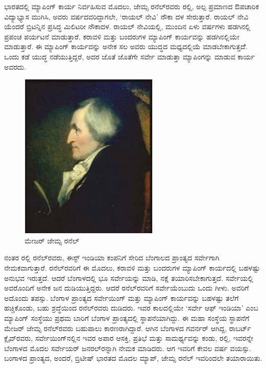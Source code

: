 ಭಾರತದಲ್ಲಿ ಮ್ಯಾಪಿಂಗ್​ ಕಾರ್ಯ ನಿರ್ವಹಿಸುವ ಮೊದಲು, ಜೇಮ್ಸ ರನೆಲ್​ರವರು  ರಲ್ಲಿ, ಅಲ್ಪ ಪ್ರಮಾಣದ ಔಪಚಾರಿಕ ವಿದ್ಯಾಭ್ಯಾಸ ಮುಗಿಸಿ, ಅವರು  ವರ್ಷದವರಿದ್ದಾಗಲೇ, ‘ರಾಯಲ್​ ನೇವಿ’ ನೌಕಾ ದಳ ಸೇರುತ್ತಾರೆ. ರಾಯಲ್​ ನೇವಿ ಯೆಂದರೆ ಬ್ರಿಟನ್ನಿನ ಪ್ರಸಿದ್ಧ ಮಿಲಿಟರೀ ನೌಕಾದಳ. ರಾಯಲ್​ ನೇವಿಯಲ್ಲಿ, ಮುಂದಿನ ಏಳು ವರ್ಷಗಳು ಹಡಗಿನಲ್ಲಿ ಪ್ರಪಂಚ ಪರ್ಯಟನೆ ಮಾಡುತ್ತಾರೆ. ಕರಾವಳಿ ಮತ್ತು ಬಂದರುಗಳ ಮ್ಯಾಪಿಂಗ್​ ಕಾರ್ಯವನ್ನು ಹಡಗಿನಲ್ಲಿಯೇ ಮಾಡುತ್ತಾರೆ. ಈ ಮ್ಯಾಪಿಂಗ್​ ಕಾರ್ಯವನ್ನು ಅನೇಕ ಸಲ ಅವರು ಯುದ್ಧದ ಮಧ್ಯದಲ್ಲಿಯೆ ಮಾಡಬೇಕಾಗುತ್ತದೆೆ. ಒಂದು ಕಡೆ ಯುದ್ಧ ನಡೆಯುತ್ತಿದ್ದರೆ, ಅದರ ಜೊತೆ ಜೊತೆಗೇ ಸರ್ವೇ ಮಾಡುತ್ತಾ ಮ್ಯಾಪಿಂಗನ್ನು ಮಾಡುವ ಕಾರ್ಯ ಅವರದು.

\begin{figure}
\includegraphics[scale=0.6]{"images/image017.jpg"}
\caption{ಮೇಜರ್​ ಜೇಮ್ಸ ರನೆಲ್​}\label{chap13-fig1}
\end{figure}

ನಂತರ  ರಲ್ಲಿ ರನೆಲ್​ರವರು, ಈಸ್ಟ್​ ಇಂಡಿಯಾ ಕಂಪನಿಗೆ ಸೇರಿದ ಬೆಂಗಾಲದ ಪ್ರಾಂತ್ಯದ ಸರ್ವೇಗಾಗಿ ನೇಮಕವಾಗುತ್ತಾರೆ. ರನೆಲ್​ರವರಿಗೆ ಈ ಮೊದಲು, ಕರಾವಳಿ ಮತ್ತು ಬಂದರುಗಳ ಮ್ಯಾಪಿಂಗ್​ ಕಾರ್ಯದಲ್ಲಿ ಬಹಳಷ್ಟು ಅನುಭವ ಇರುತ್ತದೆ. ಆದರೆ ಬೆಂಗಾಳದಲ್ಲಿ ಭೂ ಸರ್ವೇಯನ್ನು ಮಾಡಿ, ನಕ್ಷೆ ತಯಾರಿಸಬೇಕಾಗುತ್ತದೆ. ಸರ್ವೇಯಲ್ಲಿ ಅವರೊಂದಿಗೆ ಅನೇಕ ಜನ ದುಡಿಯುತ್ತಿದ್ದರು. ಆದರೆ ರನೆಲ್​ರವರಿಗೆ ಸರ್ವೇಯೆಂಬುದು ಒಂದು ಗೀಳು. ಅವರಿಗೆ ಅದೊಂದು ತಪಸ್ಸು. ಬೆಂಗಾಳ ಪ್ರಾಂತ್ಯದ ಸರ್ವೇಯಿಂಗ್​ ಮತ್ತು ಮ್ಯಾಪಿಂಗ್​ ಕಾರ್ಯವನ್ನು ಬಹಳಷ್ಟು ತಲೆಗೆ ಹಚ್ಚಿಕೊಂಡು, ಬಹು ಶ್ರದ್ಧೆಯಿಂದ ರನೆಲ್​ರವರು ದುಡಿದರು. ಇವರ ಕಾಲದಲ್ಲಿಯೇ ‘ಸರ್ವೇ ಆಫ್​ ಇಂಡಿಯಾ’ ಎಂಬ ಮ್ಯಾಪಿಂಗ್​ ಸಂಸ್ಥೆಯು ಪ್ರಥಮ ಬಾರಿಗೆ ಬೆಂಗಾಳ ಪ್ರಾಂತ್ಯದಲ್ಲಿ ಸ್ಥಾಪನೆಯಾಗಿದ್ದು. ಈ ಮಹಾ ಸಂಸ್ಥೆಯ ಸ್ಥಾಪನೆಗೆ ಮೇಜರ್​ ಜೇಮ್ಸ ರನೆಲ್​ರವರು ಬಹುಪಾಲು ಕಾರಣರಾಗಿದ್ದಾರೆ. ಆಗಿನ ಬೆಂಗಾಳದ ಗವರ್ನರ್​ ಆಗಿದ್ದ, ರಾಬರ್ಟ್ ಕ್ಲೈವ್​ರವರು, ಸರ್ವೇಯಿಂಗ್​ನಲ್ಲಿನ ಇವರ ಅಪಾರ ಆಸಕ್ತಿ, ಪ್ರತಿಭೆ ಮತ್ತು ಸಾಮರ್ಥ್ಯವನ್ನು ಕಂಡು,  ರಲ್ಲಿ, ಇವರನ್ನೇ ಬೆಂಗಾಳದ ಮೊದಲ ಸರ್ವೇಯರ್​ ಜನರಲ್​ರನ್ನಾಗಿ ನೇಮಕ ಮಾಡಿದರು. ಆಗ ಇವರಿಗೆ ಕೇವಲ  ವರ್ಷ ವಯಸ್ಸು. ಬಂಗಾಳದ ಪ್ರಾಂತ್ಯದ, ಅಂದರೆ, ಬ್ರಿಟೀಷ್​ ಭಾರತದ ಮೊದಲ ಮ್ಯಾಪ್​, ಜೇಮ್ಸ ರನೆಲ್​ ಇವರಿಂದಲೇ ತಯಾರಾಯಿತು.

